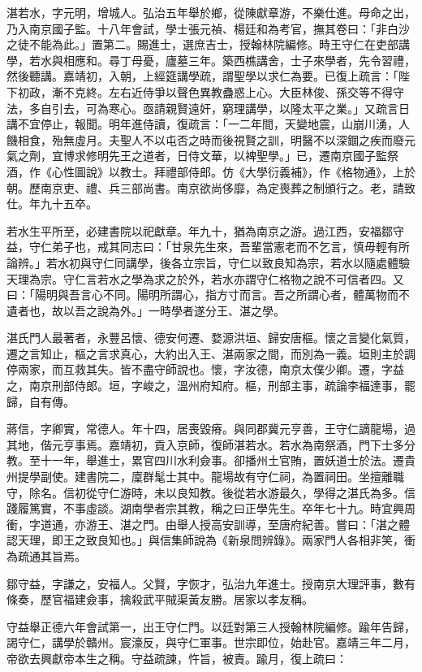 \begin{pinyinscope}
湛若水，字元明，增城人。弘治五年舉於鄉，從陳獻章游，不樂仕進。母命之出，乃入南京國子監。十八年會試，學士張元禎、楊廷和為考官，撫其卷曰：「非白沙之徒不能為此。」置第二。賜進士，選庶吉士，授翰林院編修。時王守仁在吏部講學，若水與相應和。尋丁母憂，廬墓三年。築西樵講舍，士子來學者，先令習禮，然後聽講。嘉靖初，入朝，上經筵講學疏，謂聖學以求仁為要。已復上疏言：「陛下初政，漸不克終。左右近侍爭以聲色異教蠱惑上心。大臣林俊、孫交等不得守法，多自引去，可為寒心。亟請親賢遠奸，窮理講學，以隆太平之業。」又疏言日講不宜停止，報聞。明年進侍讀，復疏言：「一二年間，天變地震，山崩川湧，人饑相食，殆無虛月。夫聖人不以屯否之時而後視賢之訓，明醫不以深錮之疾而廢元氣之劑，宜博求修明先王之道者，日侍文華，以裨聖學。」已，遷南京國子監祭酒，作《心性圖說》以教士。拜禮部侍郎。仿《大學衍義補》，作《格物通》，上於朝。歷南京吏、禮、兵三部尚書。南京欲尚侈靡，為定喪葬之制頒行之。老，請致仕。年九十五卒。

若水生平所至，必建書院以祀獻章。年九十，猶為南京之游。過江西，安福鄒守益，守仁弟子也，戒其同志曰：「甘泉先生來，吾輩當憲老而不乞言，慎毋輕有所論辨。」若水初與守仁同講學，後各立宗旨，守仁以致良知為宗，若水以隨處體驗天理為宗。守仁言若水之學為求之於外，若水亦謂守仁格物之說不可信者四。又曰：「陽明與吾言心不同。陽明所謂心，指方寸而言。吾之所謂心者，體萬物而不遺者也，故以吾之說為外。」一時學者遂分王、湛之學。

湛氏門人最著者，永豐呂懷、德安何遷、婺源洪垣、歸安唐樞。懷之言變化氣質，遷之言知止，樞之言求真心，大約出入王、湛兩家之間，而別為一義。垣則主於調停兩家，而互救其失。皆不盡守師說也。懷，字汝德，南京太僕少卿。遷，字益之，南京刑部侍郎。垣，字峻之，溫州府知府。樞，刑部主事，疏論李福達事，罷歸，自有傳。

蔣信，字卿實，常德人。年十四，居喪毀瘠。與同郡冀元亨善，王守仁謫龍場，過其地，偕元亨事焉。嘉靖初，貢入京師，復師湛若水。若水為南祭酒，門下士多分教。至十一年，舉進士，累官四川水利僉事。卻播州土官賄，置妖道士於法。遷貴州提學副使。建書院二，廩群髦士其中。龍場故有守仁祠，為置祠田。坐擅離職守，除名。信初從守仁游時，未以良知教。後從若水游最久，學得之湛氏為多。信踐履篤實，不事虛談。湖南學者宗其教，稱之曰正學先生。卒年七十九。時宜興周衝，字道通，亦游王、湛之門。由舉人授高安訓導，至唐府紀善。嘗曰：「湛之體認天理，即王之致良知也。」與信集師說為《新泉問辨錄》。兩家門人各相非笑，衝為疏通其旨焉。

鄒守益，字謙之，安福人。父賢，字恢才，弘治九年進士。授南京大理評事，數有條奏，歷官福建僉事，擒殺武平賊渠黃友勝。居家以孝友稱。

守益舉正德六年會試第一，出王守仁門。以廷對第三人授翰林院編修。踰年告歸，謁守仁，講學於贛州。宸濠反，與守仁軍事。世宗即位，始赴官。嘉靖三年二月，帝欲去興獻帝本生之稱。守益疏諫，忤旨，被責。踰月，復上疏曰：


\end{pinyinscope}
